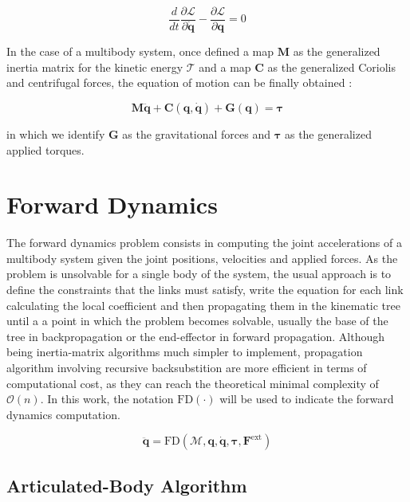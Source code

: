 \begin{equation}
    \label{eqn:lagrangian}
    \frac{d}{dt} \frac{\partial \mathcal{L}}{\partial \mathbf{\dot{q}}} - \frac{\partial \mathcal{L}}{\partial \mathbf{q}} = 0
\end{equation}

In the case of a multibody system, once defined a map $\mathbf{M}$ as the generalized inertia matrix for the kinetic energy $\mathcal{T}$ and a map $\mathbf{C}$ as the generalized Coriolis and centrifugal forces, the equation of motion can be finally obtained \citep{SicilianoKhatib2008}:

\begin{equation}
    \label{eqn:equation_of_motion}
    \mathbf{M} \mathbf{\ddot{q}} + \mathbf{C} (\mathbf{q}, \mathbf{\dot{q}}) + \mathbf{G} (\mathbf{q}) = \boldsymbol{\tau}
\end{equation}

in which we identify $\mathbf{G}$ as the gravitational forces and $\boldsymbol{\tau}$ as the generalized applied torques.

\section{Forward Dynamics}
\label{sec:back_fd}

The forward dynamics problem consists in computing the joint accelerations of a multibody system given the joint positions, velocities and applied forces. As the problem is unsolvable for a single body of the system, the usual approach is to define the constraints that the links must satisfy, write the equation for each link calculating the local coefficient and then propagating them in the kinematic tree until a a point in which the problem becomes solvable, usually the base of the tree in backpropagation or the end-effector in forward propagation. Although being inertia-matrix algorithms much simpler to implement, propagation algorithm involving recursive backsubstition are more efficient in terms of computational cost, as they can reach the theoretical minimal complexity of $\mathcal{O}(n)$. In this work, the notation $\mathrm{FD}(\cdot)$ will be used to indicate the forward dynamics computation.

\begin{equation}
    \ddot{\mathbf{q}} = \mathrm{FD} (\mathcal{M}, \mathbf{q}, \dot{\mathbf{q}}, \boldsymbol{\tau}, \mathbf{F} ^{\text{ext}})
\end{equation}

\subsection{Articulated-Body Algorithm}
\label{subsec:back_aba}

